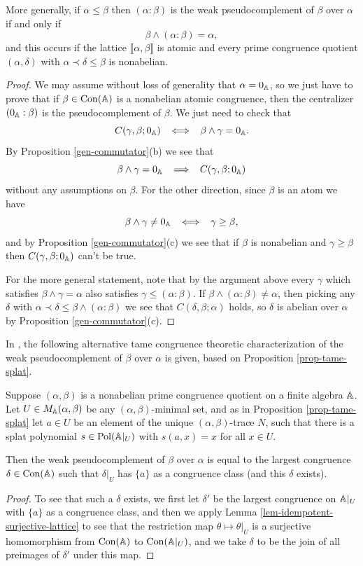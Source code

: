 \begin{appendices}
\begin{prop}
More generally, if $\alpha \le \beta$ then $(\alpha : \beta)$ is the weak pseudocomplement of $\beta$ over $\alpha$ if and only if
\[
\beta \wedge (\alpha : \beta) = \alpha,
\]
and this occurs if the lattice $\llbracket \alpha, \beta \rrbracket$ is atomic and every prime congruence quotient $(\alpha,\delta)$ with $\alpha \prec \delta \le \beta$ is nonabelian.
\end{prop}
\begin{proof} We may assume without loss of generality that $\alpha = 0_{\mathbb{A}}$, so we just have to prove that if $\beta \in \operatorname{Con}(\mathbb{A})$ is a nonabelian atomic congruence, then the centralizer $(0_{\mathbb{A}} : \beta)$ is the pseudocomplement of $\beta$. We just need to check that
\[
C(\gamma, \beta; 0_{\mathbb{A}}) \;\; \iff \;\; \beta \wedge \gamma = 0_{\mathbb{A}}.
\]
By Proposition \ref{gen-commutator}(b) we see that
\[
\beta \wedge \gamma = 0_{\mathbb{A}} \;\; \implies \;\; C(\gamma, \beta; 0_{\mathbb{A}})
\]
without any assumptions on $\beta$. For the other direction, since $\beta$ is an atom we have
\[
\beta \wedge \gamma \ne 0_{\mathbb{A}} \;\; \iff \;\; \gamma \ge \beta,
\]
and by Proposition \ref{gen-commutator}(c) we see that if $\beta$ is nonabelian and $\gamma \ge \beta$ then $C(\gamma, \beta; 0_{\mathbb{A}})$ can't be true.

For the more general statement, note that by the argument above every $\gamma$ which satisfies $\beta \wedge \gamma = \alpha$ also satisfies $\gamma \le (\alpha : \beta)$. If $\beta \wedge (\alpha : \beta) \ne \alpha$, then picking any $\delta$ with $\alpha \prec \delta \le \beta \wedge (\alpha : \beta)$ we see that $C(\delta, \beta; \alpha)$ holds, so $\delta$ is abelian over $\alpha$ by Proposition \ref{gen-commutator}(c).
\end{proof}

In \cite{hobby-mckenzie}, the following alternative tame congruence theoretic characterization of the weak pseudocomplement of $\beta$ over $\alpha$ is given, based on Proposition \ref{prop-tame-splat}.

\begin{prop} Suppose $(\alpha,\beta)$ is a nonabelian prime congruence quotient on a finite algebra $\mathbb{A}$. Let $U \in M_{\mathbb{A}}(\alpha,\beta)$ be any $(\alpha,\beta)$-minimal set, and as in Proposition \ref{prop-tame-splat} let $a \in U$ be an element of the unique $(\alpha,\beta)$-trace $N$, such that there is a splat polynomial $s \in \operatorname{Pol}(\mathbb{A}|_U)$ with $s(a,x) = x$ for all $x \in U$.

Then the weak pseudocomplement of $\beta$ over $\alpha$ is equal to the largest congruence $\delta \in \operatorname{Con}(\mathbb{A})$ such that $\delta|_U$ has $\{a\}$ as a congruence class (and this $\delta$ exists).
\end{prop}
\begin{proof} To see that such a $\delta$ exists, we first let $\delta'$ be the largest congruence on $\mathbb{A}|_U$ with $\{a\}$ as a congruence class, and then we apply Lemma \ref{lem-idempotent-surjective-lattice} to see that the restriction map $\theta \mapsto \theta|_U$ is a surjective homomorphism from $\operatorname{Con}(\mathbb{A})$ to $\operatorname{Con}(\mathbb{A}|_U)$, and we take $\delta$ to be the join of all preimages of $\delta'$ under this map.


\end{proof}
\end{appendices}
